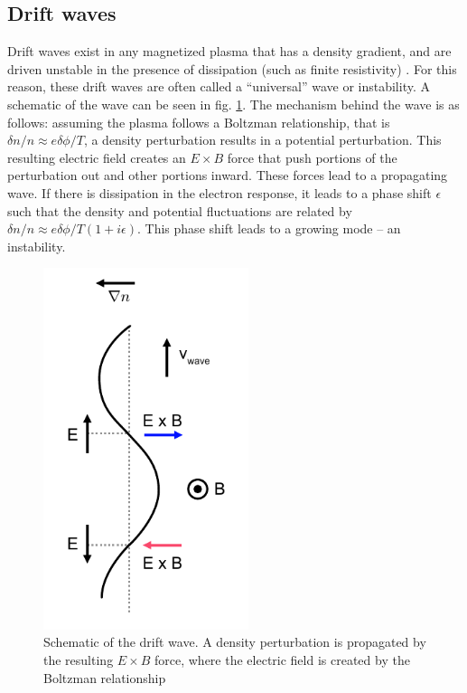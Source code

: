 \subsection{Drift waves}

Drift waves exist in any magnetized plasma that has a density gradient, and are driven unstable in the presence of dissipation (such as finite resistivity) \cite{Tynan_review_2009}. For this reason, these drift waves are often called a ``universal'' wave or instability. A schematic of the wave can be seen in fig. \ref{fig:drift-wave}. The mechanism behind the wave is as follows: assuming the plasma follows a Boltzman relationship, that is $\delta n/n \approx e \delta \phi / T$, a density perturbation results in a potential perturbation. This resulting electric field creates an $E \times B$ force that push portions of the perturbation out and other portions inward. These forces lead to a propagating wave. If there is dissipation in the electron response, it leads to a phase shift $\epsilon$ such that the density and potential fluctuations are related by $\delta n/n \approx e \delta \phi / T (1+i\epsilon)$. This phase shift leads to a growing mode -- an instability.

\begin{figure}
	\centering
	\includegraphics[width=170pt]{figures/drift-wave.pdf}
	\caption[Schematic of a drift wave]{\label{fig:drift-wave}Schematic of the drift wave. A density perturbation is propagated by the resulting $E \times B$ force, where the electric field is created by the Boltzman relationship}
\end{figure}

